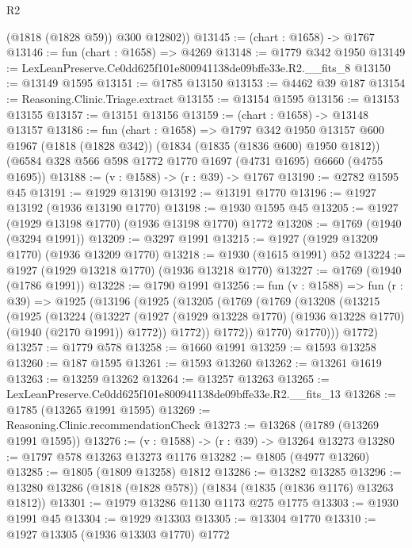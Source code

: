 \begin{lexlean}{R2}
\begin{coremodule}
        (@1818 (@1828 @59))
        @300
        @12802))
@13145 := (chart : @1658) -> @1767
@13146 := fun (chart : @1658) => @4269
@13148 := @1779 @342 @1950
@13149 := LexLeanPreserve.Ce0dd625f101e800941138de09bffe33e.R2.__fits_8
@13150 := @13149 @1595
@13151 := @1785 @13150
@13153 := @4462 @39 @187
@13154 := Reasoning.Clinic.Triage.extract
@13155 := @13154 @1595
@13156 := @13153 @13155
@13157 := @13151 @13156
@13159 := (chart : @1658) -> @13148 @13157
@13186 := fun (chart : @1658) =>
  @1797
    @342
    @1950
    @13157
    @600
    @1967
    (@1818 (@1828 @342))
    (@1834 (@1835 (@1836 @600) @1950 @1812))
    (@6584 @328 @566 @598 @1772 @1770 @1697 (@4731 @1695) @6660 (@4755 @1695))
@13188 := (v : @1588) -> (r : @39) -> @1767
@13190 := @2782 @1595 @45
@13191 := @1929 @13190
@13192 := @13191 @1770
@13196 := @1927 @13192 (@1936 @13190 @1770)
@13198 := @1930 @1595 @45
@13205 := @1927 (@1929 @13198 @1770) (@1936 @13198 @1770) @1772
@13208 := @1769 (@1940 (@3294 @1991))
@13209 := @3297 @1991
@13215 := @1927 (@1929 @13209 @1770) (@1936 @13209 @1770)
@13218 := @1930 (@1615 @1991) @52
@13224 := @1927 (@1929 @13218 @1770) (@1936 @13218 @1770)
@13227 := @1769 (@1940 (@1786 @1991))
@13228 := @1790 @1991
@13256 := fun (v : @1588) =>
  fun (r : @39) =>
  @1925
    (@13196
      (@1925
        (@13205
          (@1769
            (@1769
              (@13208
                (@13215
                  (@1925
                    (@13224
                      (@13227
                        (@1927
                          (@1929 @13228 @1770)
                          (@1936 @13228 @1770)
                          (@1940 (@2170 @1991))
                          @1772))
                      @1772))
                  @1772))
              @1770)
            @1770)))
      @1772)
@13257 := @1779 @578
@13258 := @1660 @1991
@13259 := @1593 @13258
@13260 := @187 @1595
@13261 := @1593 @13260
@13262 := @13261 @1619
@13263 := @13259 @13262
@13264 := @13257 @13263
@13265 := LexLeanPreserve.Ce0dd625f101e800941138de09bffe33e.R2.__fits_13
@13268 := @1785 (@13265 @1991 @1595)
@13269 := Reasoning.Clinic.recommendationCheck
@13273 := @13268 (@1789 (@13269 @1991 @1595))
@13276 := (v : @1588) -> (r : @39) -> @13264 @13273
@13280 := @1797 @578 @13263 @13273 @1176
@13282 := @1805 (@4977 @13260)
@13285 := @1805 (@1809 @13258) @1812
@13286 := @13282 @13285
@13296 := @13280 @13286 (@1818 (@1828 @578)) (@1834 (@1835 (@1836 @1176) @13263 @1812))
@13301 := @1979 @13286 @1130 @1173 @275 @1775
@13303 := @1930 @1991 @45
@13304 := @1929 @13303
@13305 := @13304 @1770
@13310 := @1927 @13305 (@1936 @13303 @1770) @1772

\end{coremodule}
\end{lexlean}

